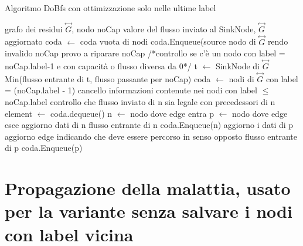 \documentclass{article}
\begin{document}
\begin{algorithm}
\caption{Algoritmo DoBfs con ottimizzazione solo nelle ultime label}
\begin{algorithmic}
\REQUIRE grafo dei residui $\overset{\leftrightarrow}{G}$, nodo noCap
\ENSURE valore del flusso inviato al SinkNode, $\overset{\leftrightarrow}{G}$ aggiornato
\STATE coda $\leftarrow$ coda vuota di nodi
\STATE coda.Enqueue(source nodo di $\overset{\leftrightarrow}{G}$
\ELSE
\STATE rendo invalido noCap
\STATE provo a riparare noCap /*controllo se c'è un nodo con label = noCap.label-1 e con capacità o flusso diversa da 0*/
\STATE t $\leftarrow$ SinkNode di $\overset{\leftrightarrow}{G}$
\RETURN Min(flusso entrante di t, flusso passante per noCap)
\ENDIF
\STATE coda $\leftarrow$ nodi di $\overset{\leftrightarrow}{G}$ con label = (noCap.label - 1)
\STATE cancello informazioni contenute nei nodi con label $\leq$ noCap.label
\STATE controllo che flusso inviato di n sia legale con precedessori di n
\ENDFOR
\ENDIF
{}
\STATE element  $\leftarrow$ coda.dequeue()
\STATE n $\leftarrow$ nodo dove edge entra
\STATE p $\leftarrow$ nodo dove edge esce
\STATE aggiorno dati di n 
\RETURN flusso entrante di n
\ELSE
\STATE coda.Enqueue(n)
\ENDIF
{}
\STATE aggiorno i dati di p
\STATE aggiorno edge indicando che deve essere percorso in senso opposto
\RETURN flusso entrante di p
\ELSE
\STATE coda.Enqueue(p)
\ENDIF
\ENDIF
\ENDIF
\ENDIF
\ENDFOR
\ENDWHILE
{}
\end{algorithmic}
\end{algorithm} 
\section {Propagazione della malattia, usato per la variante senza salvare i nodi con label vicina}
\end{document}
